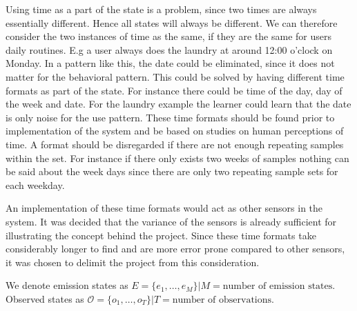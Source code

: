 Using time as a part of the state is a problem, since two times are always essentially different. Hence all states will always be different. We can therefore consider the two instances of time as the same, if they are the same for users daily routines. E.g a user always does the laundry at around 12:00 o'clock on Monday. In a pattern like this, the date could be eliminated, since it does not matter for the behavioral pattern. This could be solved by having different time formats as part of the state. For instance there could be time of the day, day of the week and date. For the laundry example the learner could learn that the date is only noise for the use pattern. These time formats should be found prior to implementation of the system and be based on studies on human perceptions of time. A format should be disregarded if there are not enough repeating samples within the set. For instance if there only exists two weeks of samples nothing can be said about the week days since there are only two repeating sample sets for each weekday.

An implementation of these time formats would act as other sensors in the system. It was decided that the variance of the sensors is already sufficient for illustrating the concept behind the project. Since these time formats take considerably longer to find and are more error prone compared to other sensors, it was chosen to delimit the project from this consideration.  


We denote emission states as $E=\{e_1, \dots ,e_{M}\}|M = \text{number of emission states}$. Observed states as $\mathcal{O}=\{o_1, \dots , o_T\}|T = \text{number of observations}$.


